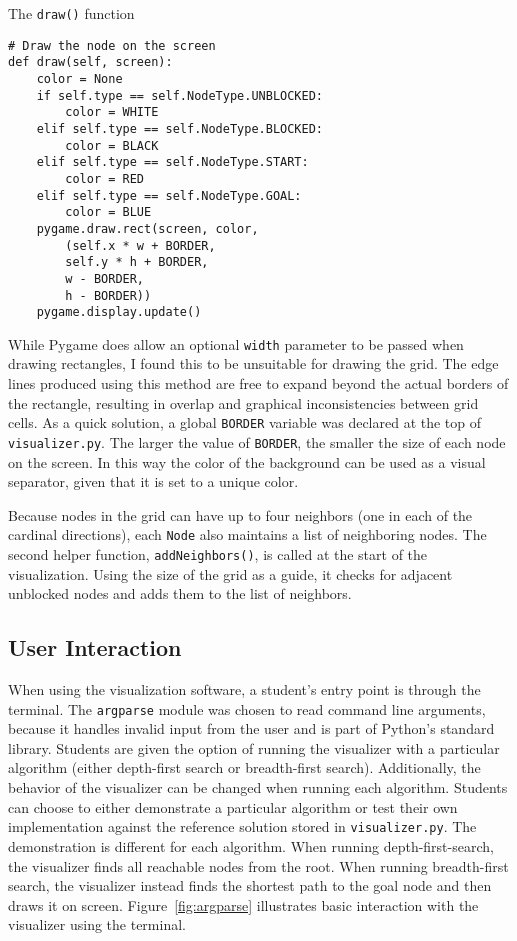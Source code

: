 \documentclass[pageno]{jpaper}
\begin{document}
\begin{listing}[hbt]
\centering
\begin{minipage}{0.8\textwidth}%
\linespread{1.0}
\caption{The \texttt{draw()} function}
\begin{verbatim}
# Draw the node on the screen
def draw(self, screen):
	color = None
	if self.type == self.NodeType.UNBLOCKED:
		color = WHITE
	elif self.type == self.NodeType.BLOCKED:
		color = BLACK
	elif self.type == self.NodeType.START:
		color = RED
	elif self.type == self.NodeType.GOAL:
		color = BLUE
	pygame.draw.rect(screen, color, 
		(self.x * w + BORDER, 
		self.y * h + BORDER, 
		w - BORDER, 
		h - BORDER))
	pygame.display.update()
\end{verbatim}
\label{lst:draw}
\end{minipage}
\end{listing}

While Pygame does allow an optional \texttt{width} parameter to be passed when drawing rectangles, I found this to be unsuitable for drawing the grid. The edge lines produced using this method are free to expand beyond the actual borders of the rectangle, resulting in overlap and graphical inconsistencies between grid cells. As a quick solution, a global \texttt{BORDER} variable was declared at the top of \texttt{visualizer.py}. The larger the value of \texttt{BORDER}, the smaller the size of each node on the screen. In this way the color of the background can be used as a visual separator, given that it is set to a unique color.

Because nodes in the grid can have up to four neighbors (one in each of the cardinal directions), each \texttt{Node} also maintains a list of neighboring nodes. The second helper function, \texttt{addNeighbors()}, is called at the start of the visualization. Using the size of the grid as a guide, it checks for adjacent unblocked nodes and adds them to the list of neighbors.

\subsection{User Interaction}

When using the visualization software, a student's entry point is through the terminal. The \texttt{argparse} module was chosen to read command line arguments, because it handles invalid input from the user and is part of Python's standard library. Students are given the option of running the visualizer with a particular algorithm (either depth-first search or breadth-first search). Additionally, the behavior of the visualizer can be changed when running each algorithm. Students can choose to either demonstrate a particular algorithm or test their own implementation against the reference solution stored in \texttt{visualizer.py}. The demonstration is different for each algorithm. When running depth-first-search, the visualizer finds all reachable nodes from the root. When running breadth-first search, the visualizer instead finds the shortest path to the goal node and then draws it on screen. Figure~\ref{fig:argparse} illustrates basic interaction with the visualizer using the terminal.
\end{document}

